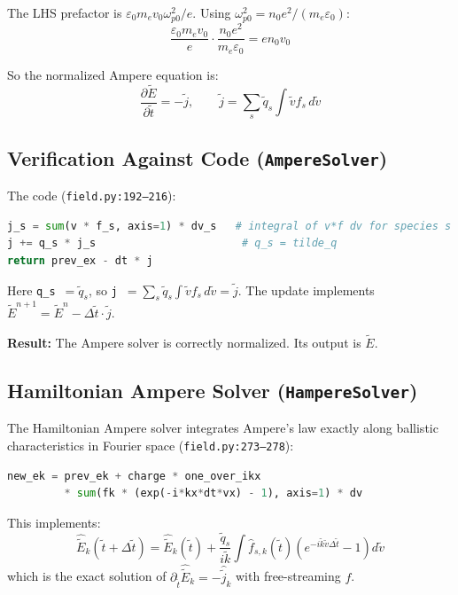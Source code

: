\documentclass[11pt]{article}
\newcommand{\tl}[1]{\tilde{#1}}
\newcommand{\wpz}{\omega_{p0}}
\newcommand{\code}[1]{\texttt{#1}}
\newcommand{\tq}{\tl{q}}
\begin{document}
The LHS prefactor is $\varepsilon_0 m_e v_0 \wpz^2 / e$. Using $\wpz^2 = n_0 e^2 / (m_e \varepsilon_0)$:
\begin{equation}
    \frac{\varepsilon_0 m_e v_0}{e} \cdot \frac{n_0 e^2}{m_e \varepsilon_0} = e n_0 v_0
\end{equation}

So the normalized Ampere equation is:
\begin{equation}
    \boxed{\frac{\partial \tl{E}}{\partial \tl{t}} = -\tl{j}, \qquad
    \tl{j} = \sum_s \tq_s \int \tl{v} f_s \, d\tl{v}}
    \label{eq:ampere-norm}
\end{equation}

\subsection{Verification Against Code (\code{AmpereSolver})}

The code (\code{field.py:192--216}):
\begin{lstlisting}[language=Python]
j_s = sum(v * f_s, axis=1) * dv_s   # integral of v*f dv for species s
j += q_s * j_s                       # q_s = tilde_q
return prev_ex - dt * j
\end{lstlisting}

Here \code{q\_s}~$= \tq_s$, so \code{j}~$= \sum_s \tq_s \int \tl{v} f_s \, d\tl{v} = \tl{j}$. The update implements $\tl{E}^{n+1} = \tl{E}^n - \Delta\tl{t} \cdot \tl{j}$.

\begin{center}
\colorbox{green!15}{\parbox{0.85\textwidth}{
\textbf{Result:} The Ampere solver is correctly normalized. Its output is $\tl{E}$.
}}
\end{center}

\subsection{Hamiltonian Ampere Solver (\code{HampereSolver})}

The Hamiltonian Ampere solver integrates Ampere's law exactly along ballistic characteristics in Fourier space (\code{field.py:273--278}):
\begin{lstlisting}[language=Python]
new_ek = prev_ek + charge * one_over_ikx
         * sum(fk * (exp(-i*kx*dt*vx) - 1), axis=1) * dv
\end{lstlisting}

This implements:
\begin{equation}
    \hat{\tl{E}}_k(\tl{t}+\Delta\tl{t}) = \hat{\tl{E}}_k(\tl{t})
    + \frac{\tq_s}{i\tl{k}} \int \hat{f}_{s,k}(\tl{t}) \left(e^{-i\tl{k}\tl{v}\Delta\tl{t}} - 1\right) d\tl{v}
\end{equation}
which is the exact solution of $\partial_{\tl{t}} \hat{\tl{E}}_k = -\hat{\tl{j}}_k$ with free-streaming $f$.
\end{document}
